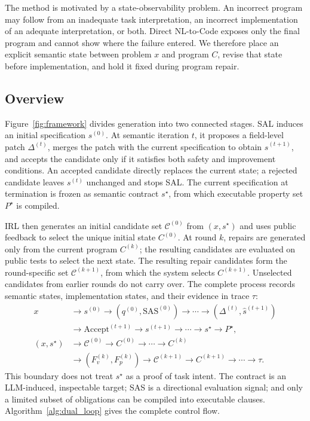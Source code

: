 The method is motivated by a state-observability problem. An incorrect program may follow from an inadequate task interpretation, an incorrect implementation of an adequate interpretation, or both. Direct NL-to-Code exposes only the final program and cannot show where the failure entered. We therefore place an explicit semantic state between problem $x$ and program $C$, revise that state before implementation, and hold it fixed during program repair.

\subsection{Overview}

Figure~\ref{fig:framework} divides generation into two connected stages. SAL induces an initial specification $s^{(0)}$. At semantic iteration $t$, it proposes a field-level patch $\Delta^{(t)}$, merges the patch with the current specification to obtain $\hat{s}^{(t+1)}$, and accepts the candidate only if it satisfies both safety and improvement conditions. An accepted candidate directly replaces the current state; a rejected candidate leaves $s^{(t)}$ unchanged and stops SAL. The current specification at termination is frozen as semantic contract $s^\star$, from which executable property set $P^\star$ is compiled.

IRL then generates an initial candidate set $\mathcal C^{(0)}$ from $(x,s^\star)$ and uses public feedback to select the unique initial state $C^{(0)}$. At round $k$, repairs are generated only from the current program $C^{(k)}$; the resulting candidates are evaluated on public tests to select the next state. The resulting repair candidates form the round-specific set $\mathcal C^{(k+1)}$, from which the system selects $C^{(k+1)}$. Unselected candidates from earlier rounds do not carry over. The complete process records semantic states, implementation states, and their evidence in trace $\tau$:
\begin{equation}
\begin{aligned}
x &\rightarrow s^{(0)}\rightarrow(q^{(0)},\mathrm{SAS}^{(0)})\rightarrow\cdots
\rightarrow(\Delta^{(t)},\hat{s}^{(t+1)})\\
&\rightarrow \mathrm{Accept}^{(t+1)}\rightarrow s^{(t+1)}\rightarrow\cdots
\rightarrow s^\star\rightarrow P^\star,\\
(x,s^\star)&\rightarrow\mathcal C^{(0)}\rightarrow C^{(0)}\rightarrow\cdots\rightarrow C^{(k)}\\
&\rightarrow(F_v^{(k)},F_p^{(k)})\rightarrow\mathcal C^{(k+1)}
\rightarrow C^{(k+1)}\rightarrow\cdots\rightarrow\tau.
\end{aligned}
\label{eq:transition}
\end{equation}
This boundary does not treat $s^\star$ as a proof of task intent. The contract is an LLM-induced, inspectable target; SAS is a directional evaluation signal; and only a limited subset of obligations can be compiled into executable clauses. Algorithm~\ref{alg:dual_loop} gives the complete control flow.

